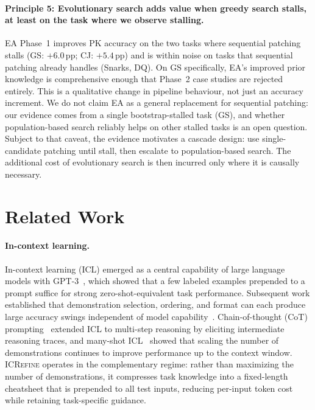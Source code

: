 \documentclass{article}
\begin{document}
\paragraph{Principle 5: Evolutionary search adds value when greedy search stalls,
at least on the task where we observe stalling.}
EA Phase~1 improves PK accuracy on the two tasks where sequential patching stalls
(GS: $+6.0$\,pp; CJ: $+5.4$\,pp) and is within noise on tasks that sequential patching
already handles (Snarks, DQ).
On GS specifically, EA's improved prior knowledge is comprehensive enough that Phase~2
case studies are rejected entirely. This is a qualitative change in pipeline behaviour, not just an
accuracy increment.
We do not claim EA as a general replacement for sequential patching: our evidence comes from
a single bootstrap-stalled task (GS), and whether population-based search reliably helps
on other stalled tasks is an open question.
Subject to that caveat, the evidence motivates a cascade design: use single-candidate
patching until stall, then escalate to population-based search. The additional cost of
evolutionary search is then incurred only where it is causally necessary.




\section{Related Work}
\label{sec:related}

\paragraph{In-context learning.}
In-context learning (ICL) emerged as a central capability of large language models with
GPT-3~\citep{brown2020gpt3}, which showed that a few labeled examples prepended to a prompt
suffice for strong zero-shot-equivalent task performance.
Subsequent work established that demonstration selection, ordering, and format can each
produce large accuracy swings independent of model capability~\citep{zhao2021calibrate,lu2022order}.
Chain-of-thought (CoT) prompting~\citep{wei2022cot} extended ICL to multi-step reasoning
by eliciting intermediate reasoning traces, and many-shot ICL~\citep{agarwal2024manyshot}
showed that scaling the number of demonstrations continues to improve performance up to the
context window.
\textsc{ICRefine} operates in the complementary regime: rather than maximizing the number of
demonstrations, it compresses task knowledge into a fixed-length cheatsheet that is prepended
to all test inputs, reducing per-input token cost while retaining task-specific guidance.
\end{document}
